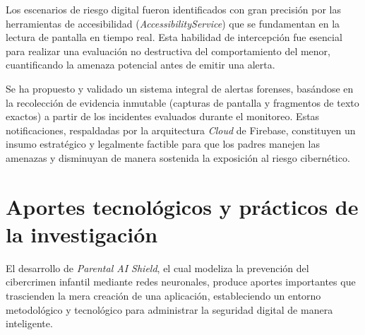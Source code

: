 Los escenarios de riesgo digital fueron identificados con gran precisión por las herramientas de accesibilidad (\textit{AccessibilityService}) que se fundamentan en la lectura de pantalla en tiempo real. Esta habilidad de intercepción fue esencial para realizar una evaluación no destructiva del comportamiento del menor, cuantificando la amenaza potencial antes de emitir una alerta.

Se ha propuesto y validado un sistema integral de alertas forenses, basándose en la recolección de evidencia inmutable (capturas de pantalla y fragmentos de texto exactos) a partir de los incidentes evaluados durante el monitoreo. Estas notificaciones, respaldadas por la arquitectura \textit{Cloud} de Firebase, constituyen un insumo estratégico y legalmente factible para que los padres manejen las amenazas y disminuyan de manera sostenida la exposición al riesgo cibernético.

\section{Aportes tecnológicos y prácticos de la investigación}
El desarrollo de \textit{Parental AI Shield}, el cual modeliza la prevención del cibercrimen infantil mediante redes neuronales, produce aportes importantes que trascienden la mera creación de una aplicación, estableciendo un entorno metodológico y tecnológico para administrar la seguridad digital de manera inteligente.


